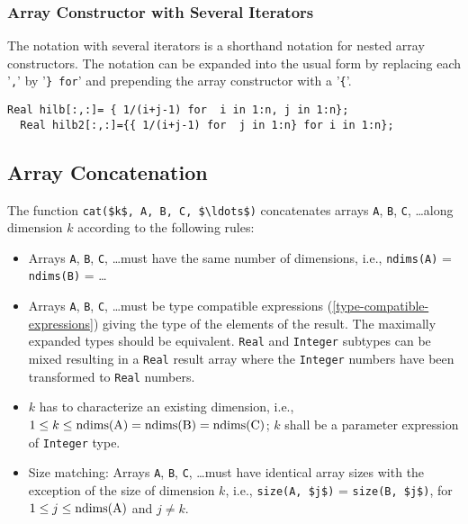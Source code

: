 \subsubsection{Array Constructor with Several Iterators}

The notation with several iterators is a shorthand notation for nested
array constructors. The notation can be expanded into the usual form by
replacing each '\lstinline!,!' by '\lstinline!} for!' and prepending the array constructor with
a '\lstinline!{!'.

\begin{example}
\begin{lstlisting}[language=modelica]
  Real hilb[:,:]= { 1/(i+j-1) for  i in 1:n, j in 1:n};
  Real hilb2[:,:]={{ 1/(i+j-1) for  j in 1:n} for i in 1:n};
\end{lstlisting}
\end{example}

\subsection{Array Concatenation}

The function \lstinline[mathescape=true]!cat($k$, A, B, C, $\ldots$)! concatenates arrays
\lstinline!A!, \lstinline!B!, \lstinline!C!, \ldots along
dimension $k$ according to the following rules:
\begin{itemize}
\item
  Arrays \lstinline!A!, \lstinline!B!, \lstinline!C!, \ldots must have the same number of dimensions, i.e.,
  \lstinline!ndims(A)! = \lstinline!ndims(B)! = \ldots
\item
  Arrays \lstinline!A!, \lstinline!B!, \lstinline!C!, \ldots must be type compatible expressions (\autoref{type-compatible-expressions})
  giving the type of the elements of the result. The maximally expanded
  types should be equivalent. \lstinline!Real! and \lstinline!Integer! subtypes can be mixed
  resulting in a \lstinline!Real! result array where the \lstinline!Integer! numbers have been
  transformed to \lstinline!Real! numbers.
\item
  $k$ has to characterize an existing dimension, i.e., $1 \leq k \leq \text{\lstinline!ndims(A)!} = \text{\lstinline!ndims(B)!} = \text{\lstinline!ndims(C)!}$; $k$ shall be a parameter expression of \lstinline!Integer! type.
\item
  Size matching: Arrays \lstinline!A!, \lstinline!B!, \lstinline!C!, \ldots must have identical array sizes
  with the exception of the size of dimension $k$, i.e., \lstinline[mathescape=true]!size(A, $j$)! =
  \lstinline[mathescape=true]!size(B, $j$)!, for $1 \leq j \leq \text{\lstinline!ndims(A)!}$ and $j \neq k$.
\end{itemize}

